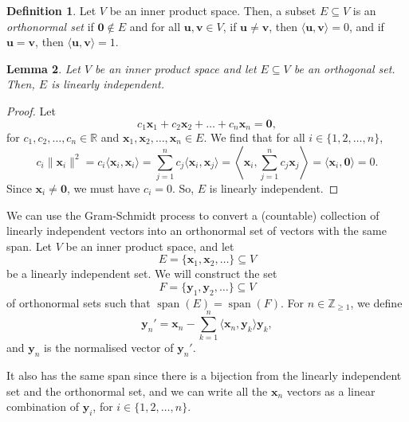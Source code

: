 \documentclass[a4paper, openany]{memoir}
\theoremstyle{definition}
\newtheorem{definition}{Definition}[section]
\theoremstyle{plain}
\newtheorem{lemma}[definition]{Lemma}
\begin{document}
    \begin{definition}
        Let $V$ be an inner product space. Then, a subset $E \subseteq V$ is an \emph{orthonormal set} if $\bm{0} \not\in E$ and for all $\bm{u}, \bm{v} \in V$, if $\bm{u} \neq \bm{v}$, then $\langle \bm{u}, \bm{v} \rangle = 0$, and if $\bm{u} = \bm{v}$, then $\langle \bm{u}, \bm{v} \rangle = 1$.
    \end{definition}

    \begin{lemma}
        Let $V$ be an inner product space and let $E \subseteq V$ be an orthogonal set. Then, $E$ is linearly independent.
    \end{lemma}
    \begin{proof}
        Let
        \[c_1 \bm{x}_1 + c_2 \bm{x}_2 + \dots + c_n \bm{x}_n = \bm{0},\]
        for $c_1, c_2, \dots, c_n \in \mathbb{R}$ and $\bm{x}_1, \bm{x}_2, \dots, \bm{x}_n \in E$. We find that for all $i \in \{1, 2, \dots, n\}$,
        \[c_i \lVert \bm{x}_i \rVert^2 = c_i \langle \bm{x}_i, \bm{x}_i \rangle = \sum_{j=1}^n c_j \langle \bm{x}_i, \bm{x}_j \rangle = \left\langle \bm{x}_i, \sum_{j=1}^n c_j \bm{x}_j \right\rangle = \langle \bm{x}_i, \bm{0} \rangle = 0.\]
        Since $\bm{x}_i \neq \bm{0}$, we must have $c_i = 0$. So, $E$ is linearly independent.
    \end{proof}

    We can use the Gram-Schmidt process to convert a (countable) collection of linearly independent vectors into an orthonormal set of vectors with the same span. Let $V$ be an inner product space, and let
    \[E = \{\bm{x}_1, \bm{x}_2, \dots\} \subseteq V\]
    be a linearly independent set. We will construct the set 
    \[F = \{\bm{y}_1, \bm{y}_2, \dots\} \subseteq V\]
    of orthonormal sets such that $\operatorname{span} (E) = \operatorname{span} (F)$. For $n \in \mathbb{Z}_{\geq 1}$, we define
    \[\bm{y}_n' = \bm{x}_n - \sum_{k=1}^n \langle \bm{x}_n, \bm{y}_k \rangle \bm{y}_k,\]
    and $\bm{y}_n$ is the normalised vector of $\bm{y}_n'$.

    It also has the same span since there is a bijection from the linearly independent set and the orthonormal set, and we can write all the $\bm{x}_n$ vectors as a linear combination of $\bm{y}_i$, for $i \in \{1, 2, \dots, n\}$.
    
\end{document}
